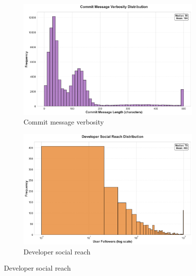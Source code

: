\documentclass[11pt]{article}
\begin{document}
\begin{figure}[H]
\centering
\begin{subfigure}[b]{0.48\textwidth}
\centering
\includegraphics[width=\textwidth]{figures_individual/37_entity_commit_message_verbosity.png}
\caption{Commit message verbosity}
\label{fig:entity_commits}
\end{subfigure}
\hfill
\begin{subfigure}[b]{0.48\textwidth}
\centering
\includegraphics[width=\textwidth]{figures_individual/38_entity_developer_social_reach.png}
\caption{Developer social reach}
\label{fig:entity_social}
\end{subfigure}

\vspace{0.3cm}


\end{figure}
\end{document}
